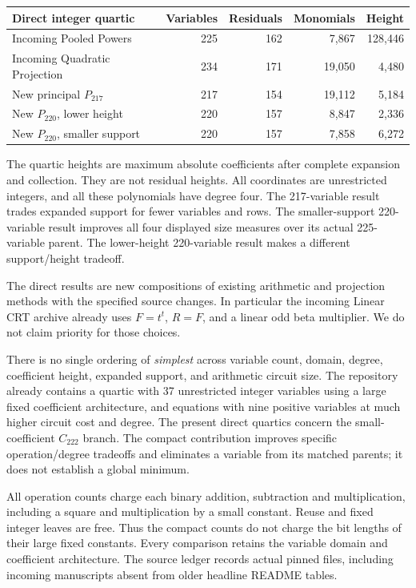 \documentclass[11pt]{article}
\theoremstyle{remark}\newtheorem{remark}[theorem]{Remark}
\begin{document}
\begin{center}\small
\begin{tabular}{@{}lrrrr@{}}
\toprule
Direct integer quartic & Variables & Residuals & Monomials & Height\\
\midrule
Incoming Pooled Powers &225&162&7,867&128,446\\
Incoming Quadratic Projection &234&171&19,050&4,480\\
\midrule
New principal $P_{217}$ &217&154&19,112&5,184\\
New $P_{220}$, lower height &220&157&8,847&2,336\\
New $P_{220}$, smaller support &220&157&7,858&6,272\\
\bottomrule
\end{tabular}
\end{center}
The quartic heights are maximum absolute coefficients after complete
expansion and collection. They are not residual heights. All coordinates
are unrestricted integers, and all these polynomials have degree four.
The 217-variable result trades expanded support for fewer variables and
rows. The smaller-support 220-variable result improves all four displayed
size measures over its actual 225-variable parent. The lower-height
220-variable result makes a different support/height tradeoff.

The direct results are new compositions of existing arithmetic and
projection methods with the specified source changes. In particular the
incoming Linear CRT archive already uses $F=t^t$, $R=F$, and a linear
odd beta multiplier. We do not claim priority for those choices.



There is no single ordering of \emph{simplest} across variable count,
domain, degree, coefficient height, expanded support, and arithmetic
circuit size. The repository already contains a quartic with 37
unrestricted integer variables using a large fixed coefficient
architecture, and equations with nine positive variables at much
higher circuit cost and degree. The present direct quartics concern
the small-coefficient $C_{222}$ branch. The compact contribution improves
specific operation/degree tradeoffs and eliminates a variable from its
matched parents; it does not establish a global minimum.

All operation counts charge each binary addition, subtraction and
multiplication, including a square and multiplication by a small
constant. Reuse and fixed integer leaves are free. Thus the compact
counts do not charge the bit lengths of their large fixed constants.
Every comparison retains the variable domain and coefficient architecture.
The source ledger records actual pinned files, including incoming
manuscripts absent from older headline README tables.
\end{document}
